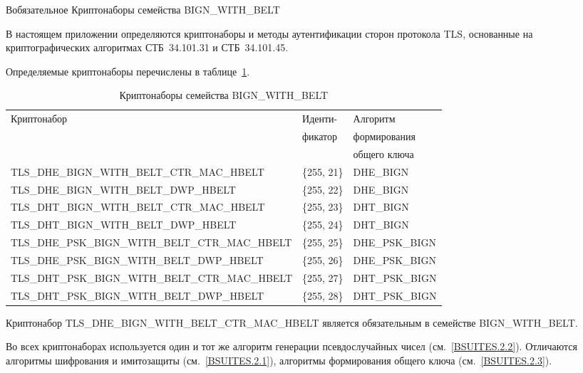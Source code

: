 \begin{appendix}{В}{обязательное}
{Криптонаборы семейства BIGN\_WITH\_BELT}
\label{BSUITES}

\mbox{}

В настоящем приложении определяются криптонаборы и методы аутентификации 
сторон протокола TLS, основанные на криптографических алгоритмах 
СТБ~34.101.31 и СТБ~34.101.45.  

\label{BSUITES.1}

Определяемые криптонаборы перечислены в таблице~\ref{Table.BSUITES.1}.

\mbox{}

\begin{table}[!h]
\caption{Криптонаборы семейства BIGN\_WITH\_BELT}\label{Table.BSUITES.1}
\begin{tabular}{|l|l|l|}
\hline
Криптонабор &  Иденти-       &  Алгоритм \\
            &  фикатор       &  формирования\\
            &                &  общего ключа\\
\hline
{\small TLS\_DHE\_BIGN\_WITH\_BELT\_CTR\_MAC\_HBELT} &	
\{255, 21\} &	
{\small DHE\_BIGN}\\
%
{\small TLS\_DHE\_BIGN\_WITH\_BELT\_DWP\_HBELT} & 
\{255, 22\} & 
{\small DHE\_BIGN}\\
\hline
%
{\small TLS\_DHT\_BIGN\_WITH\_BELT\_CTR\_MAC\_HBELT} &
\{255, 23\} &
{\small DHT\_BIGN}\\
%
{\small TLS\_DHT\_BIGN\_WITH\_BELT\_DWP\_HBELT} & 
\{255, 24\} &
{\small DHT\_BIGN}\\
\hline
%
{\small TLS\_DHE\_PSK\_BIGN\_WITH\_BELT\_CTR\_MAC\_HBELT} &	
\{255, 25\} & 
{\small DHE\_PSK\_BIGN}\\
%
{\small TLS\_DHE\_PSK\_BIGN\_WITH\_BELT\_DWP\_HBELT} & 
\{255, 26\} & 
{\small DHE\_PSK\_BIGN}\\
\hline
{\small TLS\_DHT\_PSK\_BIGN\_WITH\_BELT\_CTR\_MAC\_HBELT} & 
\{255, 27\} & 
{\small DHT\_PSK\_BIGN}\\
%
{\small TLS\_DHT\_PSK\_BIGN\_WITH\_BELT\_DWP\_HBELT} &
\{255, 28\} &
{\small DHT\_PSK\_BIGN}\\
\hline
\end{tabular}
\end{table}

Криптонабор TLS\_DHE\_BIGN\_WITH\_BELT\_CTR\_MAC\_HBELT является 
обязательным в семействе BIGN\_WITH\_BELT. 

Во всех криптонаборах используется один и тот же алгоритм генерации
псевдослучайных чисел (см.~\ref{BSUITES.2.2}). Отличаются алгоритмы шифрования
и имитозащиты (см.~\ref{BSUITES.2.1}), 
алгоритмы формирования общего ключа (см.~\ref{BSUITES.2.3}). 


\end{appendix}
